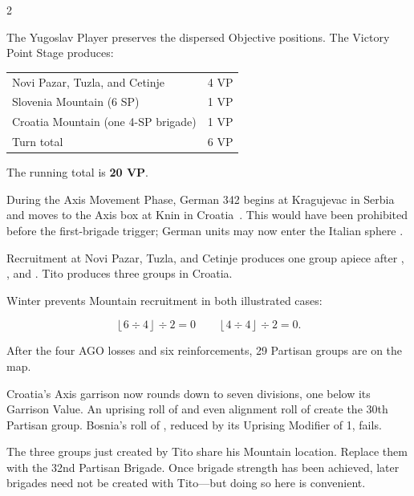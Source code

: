 \begin{multicols}{2}
\columnbreak


The Yugoslav Player preserves the dispersed Objective positions. The Victory
Point Stage produces:

\begin{tabularx}{\linewidth}{@{}Xr@{}}
  Novi Pazar, Tuzla, and Cetinje & 4 VP \\
  Slovenia Mountain (6 SP) & 1 VP \\
  Croatia Mountain (one 4-SP brigade) & 1 VP \\
  \midrule
  Turn total & 6 VP \\
\end{tabularx}

The running total is \textbf{20 VP}.

During the Axis Movement Phase, German 342 begins at Kragujevac in
Serbia~ and moves to the Axis box at Knin in
Croatia~. This would have been prohibited before the first-brigade
trigger; German units may now enter the Italian sphere .


Recruitment at Novi Pazar, Tuzla, and Cetinje produces one group apiece after
, , and . Tito produces three groups in Croatia.

Winter prevents Mountain recruitment in both illustrated cases:

\[
  \left\lfloor 6 \div 4 \right\rfloor \div 2 = 0
  \qquad
  \left\lfloor 4 \div 4 \right\rfloor \div 2 = 0.
\]

After the four AGO losses and six reinforcements, 29 Partisan groups are on
the map.

Croatia's Axis garrison now rounds down to seven divisions, one below its
Garrison Value. An uprising roll of  and even alignment roll of
 create the 30th Partisan group. Bosnia's roll of , reduced by
its Uprising Modifier of 1, fails.

The three groups just created by Tito share his Mountain location. Replace
them with the 32nd Partisan Brigade. Once brigade strength has been achieved,
later brigades need not be created with Tito—but doing so here is convenient.
\end{multicols}

